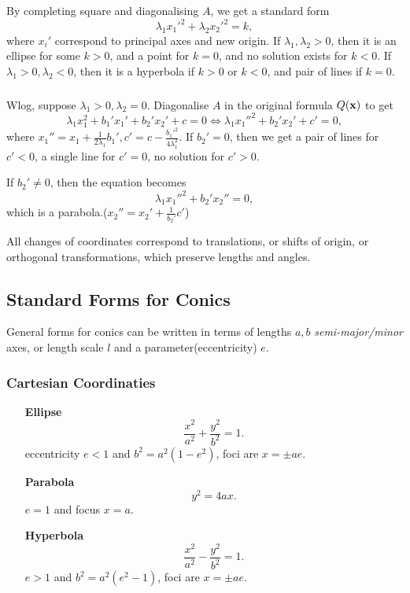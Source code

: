 \documentclass[10pt]{article}
\begin{document}
    \subsubsection*{}
    By completing square and diagonalising $A$, we get a standard form 
        \[
            \lambda_1 x_1'^2+\lambda_2 x_2'^2=k,
        \]
        where $ x_i' $ correspond to principal axes and new origin. If $ \lambda_1,\lambda_2>0 $, then it is an ellipse for some $k>0$, and a point for $k=0$, and no solution exists for $k<0$. If $ \lambda_1>0,\lambda_2<0 $, then it is a hyperbola if $k>0$ or $k<0$, and pair of lines if $k=0$.
    \subsubsection*{}
    Wlog, suppose $ \lambda_1>0,\lambda_2=0 $. Diagonalise $A$ in the original formula $Q({\bf x})$ to get
    \[
        \lambda_1 x_1^2+b_1'x_1'+b_2'x_2'+c=0 \Longleftrightarrow \lambda_1 x_1''^2+b_2'x_2'+c'=0,
    \]
    where $ x_1''=x_1+\frac{1}{2\lambda_1} b_1', c'=c-\frac{b_1'^2}{4\lambda_1^2} $. If $ b_2'=0 $, then we get a pair of lines for $c'<0$, a single line for $c'=0$, no solution for $c'>0$.

    If $ b_2'\neq 0 $, then the equation becomes 
    \[
        \lambda_1 x_1''^2+b_2'x_2''=0,
    \]
    which is a parabola.($ x_2''=x_2'+\frac{1}{b_2'}c' $)

    All changes of coordinates correspond to translations, or shifts of origin, or orthogonal transformations, which preserve lengths and angles.
    \subsection{Standard Forms for Conics}
    General forms for conics can be written in terms of lengths $a,b$ \textit{semi-major/minor} axes, or length scale $l$ and a parameter(eccentricity) $e$.

    \subsubsection{Cartesian Coordinaties}
    \begin{enumerate}[align=hang]
        \item[\bfseries Ellipse]
        \[
            \frac{x^2}{a^2}+\frac{y^2}{b^2}=1.
        \]
        eccentricity $e<1$ and $ b^2=a^2(1-e^2) $, foci are $ x=\pm ae $.
    
        \item[\bfseries Parabola]
        \[
            y^2=4ax.
        \]
        $e=1$ and focus $ x=a $.
        \item[\bfseries Hyperbola]
        \[
            \frac{x^2}{a^2}-\frac{y^2}{b^2}=1.
        \] 
        $e>1$ and $ b^2=a^2(e^2-1) $, foci are $ x=\pm ae $.
    \end{enumerate}
\end{document}
